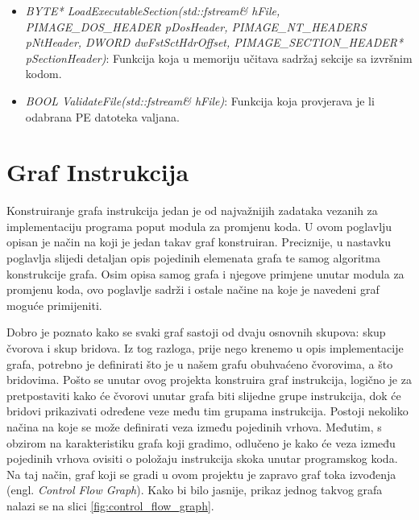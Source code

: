 \documentclass[times, utf8, diplomski, numeric]{fer}
\begin{document}
\begin{itemize}
\item {\footnotesize \emph{BYTE*
LoadExecutableSection(std::fstream\& hFile, PIMAGE\_DOS\_HEADER
pDosHeader, PIMAGE\_NT\_HEADERS pNtHeader, DWORD
dwFstSctHdrOffset, PIMAGE\_SECTION\_HEADER* pSectionHeader)}}:
Funkcija koja u memoriju učitava sadržaj sekcije sa izvršnim
kodom.

\item {\footnotesize \emph{BOOL ValidateFile(std::fstream\&
hFile)}}: Funkcija koja provjerava je li odabrana PE datoteka
valjana.

\end{itemize}

\section{Graf Instrukcija}
\label{scr:instructionGraph}
Konstruiranje grafa instrukcija jedan je od najvažnijih zadataka vezanih za implementaciju programa poput modula za promjenu koda. U ovom poglavlju opisan je način na koji je jedan takav graf konstruiran. Preciznije, u nastavku poglavlja slijedi detaljan opis pojedinih elemenata grafa te samog algoritma konstrukcije grafa. Osim opisa samog grafa i njegove primjene unutar modula za promjenu koda, ovo poglavlje sadrži i ostale načine na koje je navedeni graf moguće primijeniti. 

Dobro je poznato kako se svaki graf sastoji od dvaju osnovnih skupova: skup čvorova i skup bridova. Iz tog razloga, prije nego krenemo u opis implementacije grafa, potrebno je definirati što je u našem grafu obuhvaćeno čvorovima, a što bridovima. Pošto se unutar ovog projekta konstruira graf instrukcija, logično je za pretpostaviti kako će čvorovi unutar grafa biti slijedne grupe instrukcija, dok će bridovi prikazivati određene veze među tim grupama instrukcija. Postoji nekoliko načina na koje se može definirati veza između pojedinih vrhova. Međutim, s obzirom na karakteristiku grafa koji gradimo, odlučeno je kako će veza između pojedinih vrhova ovisiti o položaju instrukcija skoka unutar programskog koda. Na taj način, graf koji se gradi u ovom projektu je zapravo graf toka izvođenja (engl. \emph{Control Flow Graph}). Kako bi bilo jasnije, prikaz jednog takvog grafa nalazi se na slici \ref{fig:control_flow_graph}.
\end{document}
